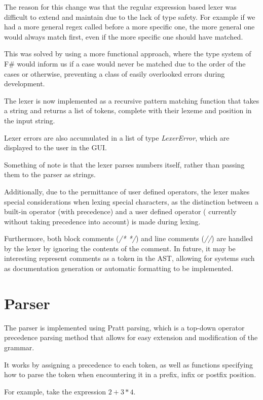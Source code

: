 The reason for this change was that the regular expression based lexer was difficult to extend and maintain due to 
the lack of type safety.
For example if we had a more general regex called before a more specific one, the more general one would always match
first, even if the more specific one should have matched.

This was solved by using a more functional approach, where the type system of F\# would inform us if a case would 
never be matched due to the order of the cases or otherwise, preventing a class of easily overlooked errors during development.

The lexer is now implemented as a recursive pattern matching function that takes a string and returns a list of 
tokens, complete with their lexeme and position in the input string.

Lexer errors are also accumulated in a list of type \textit{LexerError}, which are displayed to the user in the GUI\@.

Something of note is that the lexer parses numbers itself, rather than passing them to the parser as strings.

Additionally, due to the permittance of user defined operators, the lexer makes special considerations when lexing 
special characters, as the distinction between a built-in operator (with precedence) and a user defined operator (
currently without taking precedence into account) is made during lexing.

Furthermore, both block comments (\textit{/* */}) and line comments (\textit{//}) are handled by the lexer by ignoring
the contents of the comment.
In future, it may be interesting represent comments as a token in the AST, allowing for systems such as documentation
generation or automatic formatting to be implemented.

\section{Parser}\label{sec:parser}

The parser is implemented using Pratt parsing\citep{pratt1973top}, which is a top-down operator precedence parsing 
method that allows for easy extension and modification of the grammar.

It works by assigning a precedence to each token, as well as functions specifying how to parse the token when 
encountering it in a prefix, infix or postfix position.

For example, take the expression $2 + 3 * 4$.


